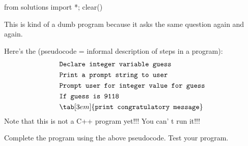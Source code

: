 \begin{python0}
from solutions import *; clear()
\end{python0}


This is kind of a dumb program because it asks the same question again
and again.

Here's the  (pseudocode = informal
description of steps in a program):
\begin{align*}
& \texttt{Declare integer variable guess}\\
& \texttt{Print a prompt string to user}\\
& \texttt{Prompt user for integer value for guess}\\
& \texttt{If guess is 9118}\\
& \tab[3em]{\texttt{print congratulatory message}}\\
\end{align*}
Note that this is not a C++ program yet!!! You can' t run
it!!!

Complete the program using the above pseudocode. Test your program.

